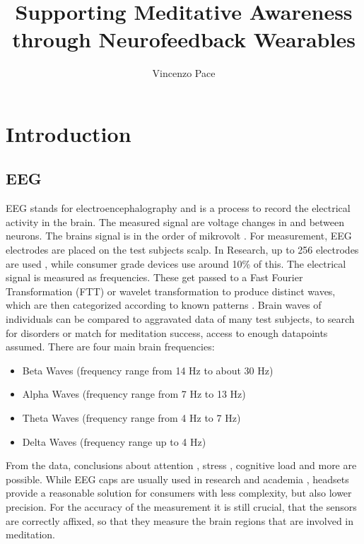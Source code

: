 \documentclass{llncs} %
\begin{document}
\title{Supporting Meditative Awareness through Neurofeedback Wearables}
\author{Vincenzo Pace}
\maketitle
\newpage
\section{Introduction}
\subsection{EEG}
EEG stands for electroencephalography and is a process to record the electrical activity in the brain. The measured signal are voltage changes in and between neurons.
The brains signal is in the order of mikrovolt \cite{Berger}.  For measurement, EEG electrodes are placed on the test subjects scalp. In Research, up to 256 electrodes are used \cite{Seeck}, while consumer grade devices use around 10\% of this. \cite{Maskeliunas}
The electrical signal is measured as frequencies. These get passed to a Fast Fourier Transformation (FTT) or wavelet transformation \cite{Akin} to produce distinct waves, which are then categorized according to known patterns \cite{Shaker}.
Brain waves of individuals can be compared to aggravated data of many test subjects, to search for disorders or match for meditation success, access to enough datapoints assumed.
There are four main brain frequencies:

\begin{itemize}
    \item 
    Beta Waves (frequency range from 14 Hz to about 30 Hz)
    \item 
    Alpha Waves (frequency range from 7 Hz to 13 Hz)
    \item 
    Theta Waves (frequency range from 4 Hz to 7 Hz)
    \item 
    Delta Waves (frequency range up to 4 Hz)
\end{itemize}
From the data, conclusions about attention \cite{Berka}, stress \cite{Hosseini}, cognitive load \cite{Antonenko} and more are possible.
While EEG caps are usually used in research and academia \cite{Seeck}, headsets provide a reasonable solution for consumers with less complexity, but also lower precision\cite{Maskeliunas}.
For the accuracy of the measurement it is still crucial, that the sensors are correctly affixed, so that they measure the brain regions that are involved in meditation.
\end{document}
